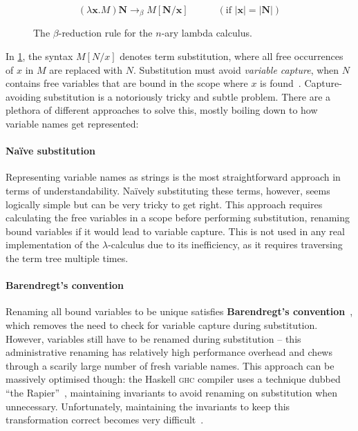 \documentclass[../../main.tex]{subfiles}
\begin{document}
\begin{figure}[htbp]
\begin{equation*}
(\lambda \mathbf{x} . M) \mathbf{N} \rightarrow_\beta M[\mathbf{N}/\mathbf{x}] \hspace{3em} (\text{if } | \mathbf{x} | = | \mathbf{N} | )
\end{equation*}
\caption{The $\beta$-reduction rule for the $n$-ary lambda calculus.}
\label{fig:beta-reduction}
\end{figure}

In \cref{fig:beta-reduction}, the syntax $M[N/x]$ denotes term substitution, where all free occurrences of $x$ in $M$ are replaced with $N$.
Substitution must avoid \emph{variable capture}, when $N$ contains free variables that are bound in the scope where $x$ is found~\cite{van-bakel_tsfpl_2022}.
Capture-avoiding substitution is a notoriously tricky and subtle problem.
There are a plethora of different approaches to solve this, mostly boiling down to how variable names get represented:

\paragraph{Naïve substitution}
Representing variable names as strings is the most straightforward approach in terms of understandability.
Naïvely substituting these terms, however, seems logically simple but can be very tricky to get right.
This approach requires calculating the free variables in a scope before performing substitution, renaming bound variables if it would lead to variable capture.
This is not used in any real implementation of the $\lambda$-calculus due to its inefficiency, as it requires traversing the term tree multiple times.

\paragraph{Barendregt's convention}
Renaming all bound variables to be unique satisfies \textbf{Barendregt's convention}~\cite{barendregt_lambda_1984}, which removes the need to check for variable capture during substitution.
However, variables still have to be renamed during substitution -- this administrative renaming has relatively high performance overhead and chews through a scarily large number of fresh variable names.
This approach can be massively optimised though: the Haskell \textsc{ghc} compiler uses a technique dubbed ``the Rapier''~\cite{peytonjones_secrets_2002}, maintaining invariants to avoid renaming on substitution when unnecessary.
Unfortunately, maintaining the invariants to keep this transformation correct becomes very difficult~\cite{maclaurin_thefoil_2023}.
\end{document}
